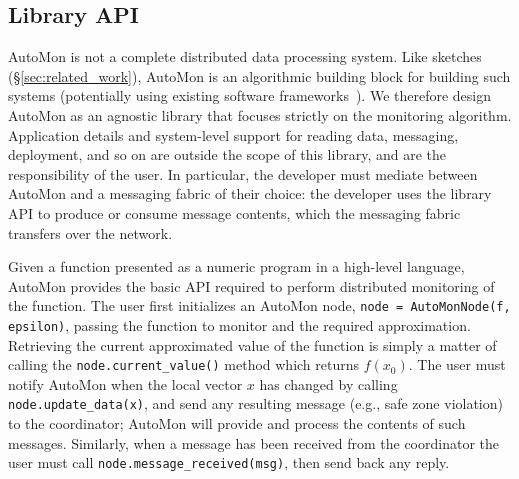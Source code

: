 \subsection{Library API} 
\label{sec:implementation}

AutoMon is not a complete distributed data processing system.
Like sketches (\S\ref{sec:related_work}), AutoMon is an algorithmic building block for building such systems (potentially using existing software frameworks~\cite{flink}).
We therefore design AutoMon as an agnostic library that focuses strictly on the monitoring algorithm.
Application details and system-level support for reading data, messaging, deployment, and so on are outside the scope of this library, and are the responsibility of the user.
In particular, the developer must mediate between AutoMon and a messaging fabric of their choice:
the developer uses the library API to produce or consume message contents, which the messaging fabric transfers over the network.\footnotemark{}


Given a function presented as a numeric program in a high-level language, AutoMon provides the basic API required to perform distributed monitoring of the function.
The user first initializes an AutoMon node, \lstinline[frame=no]{node = AutoMonNode(f, epsilon)}, passing the function to monitor and the required approximation.
Retrieving the current approximated value of the function is simply a matter of calling the \lstinline{node.current_value()} method which returns $f(x_0)$.  
%
The user must notify AutoMon when the local vector $x$ has changed by calling \lstinline{node.update_data(x)}, and send any resulting message (e.g., safe zone violation) to the coordinator;
AutoMon will provide and process the contents of such messages.
Similarly, when a message has been received from the coordinator the user must call \lstinline{node.message_received(msg)}, then send back any reply.
